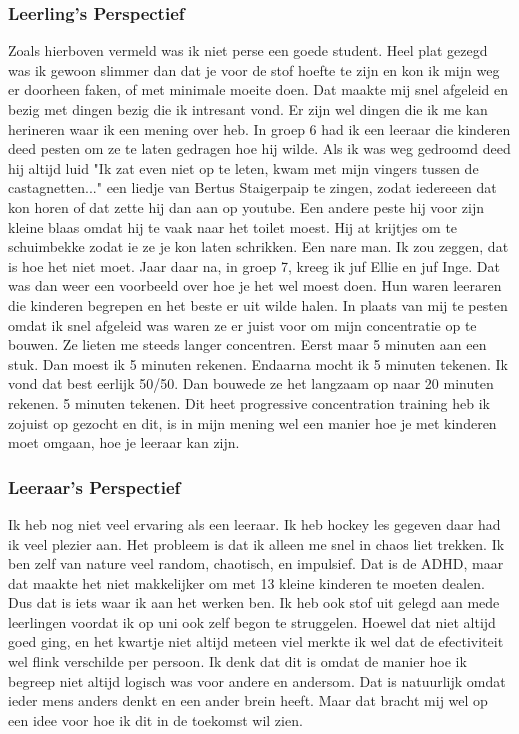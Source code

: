 \documentclass{article}
\begin{document}
            \subsubsection{Leerling's Perspectief}
                Zoals hierboven vermeld was ik niet perse een goede student. Heel plat gezegd was ik gewoon slimmer dan dat je voor de stof hoefte te zijn en kon ik mijn weg er doorheen faken, of met minimale moeite doen. Dat maakte mij snel afgeleid en bezig met dingen bezig die ik intresant vond.
                \bigskip
                \noindent Er zijn wel dingen die ik me kan herineren waar ik een mening over heb. In groep 6 had ik een leeraar die kinderen deed pesten om ze te laten gedragen hoe hij wilde. Als ik was weg gedroomd deed hij altijd luid "Ik zat even niet op te leten, kwam met mijn vingers tussen de castagnetten..." een liedje van Bertus Staigerpaip te zingen, zodat iedereeen dat kon horen of dat zette hij dan aan op youtube. Een andere peste hij voor zijn kleine blaas omdat hij te vaak naar het toilet moest. Hij at krijtjes om te schuimbekke zodat ie ze je kon laten schrikken. Een nare man. Ik zou zeggen, dat is hoe het niet moet.
                \bigskip
                \noindent Jaar daar na, in groep 7, kreeg ik juf Ellie en juf Inge. Dat was dan weer een voorbeeld over hoe je het wel moest doen. Hun waren leeraren die kinderen begrepen en het beste er uit wilde halen. In plaats van mij te pesten omdat ik snel afgeleid was waren ze er juist voor om mijn concentratie op te bouwen. Ze lieten me steeds langer concentren. Eerst maar 5 minuten aan een stuk. Dan moest ik 5 minuten rekenen. Endaarna mocht ik 5 minuten tekenen. Ik vond dat best eerlijk 50/50. Dan bouwede ze het langzaam op naar 20 minuten rekenen. 5 minuten tekenen. Dit heet progressive concentration training heb ik zojuist op gezocht en dit, is in mijn mening wel een manier hoe je met kinderen moet omgaan, hoe je leeraar kan zijn.

            \subsubsection{Leeraar's Perspectief}
                Ik heb nog niet veel ervaring als een leeraar. Ik heb hockey les gegeven daar had ik veel plezier aan. Het probleem is dat ik alleen me snel in chaos liet trekken. Ik ben zelf van nature veel random, chaotisch, en impulsief. Dat is de ADHD, maar dat maakte het niet makkelijker om met 13 kleine kinderen te moeten dealen. Dus dat is iets waar ik aan het werken ben.
                \bigskip
                \noindent Ik heb ook stof uit gelegd aan mede leerlingen voordat ik op uni ook zelf begon te struggelen. Hoewel dat niet altijd goed ging, en het kwartje niet altijd meteen viel merkte ik wel dat de efectiviteit wel flink verschilde per persoon. Ik denk dat dit is omdat de manier hoe ik begreep niet altijd logisch was voor andere en andersom. Dat is natuurlijk omdat ieder mens anders denkt en een ander brein heeft. Maar dat bracht mij wel op een idee voor hoe ik dit in de toekomst wil zien.
\end{document}
